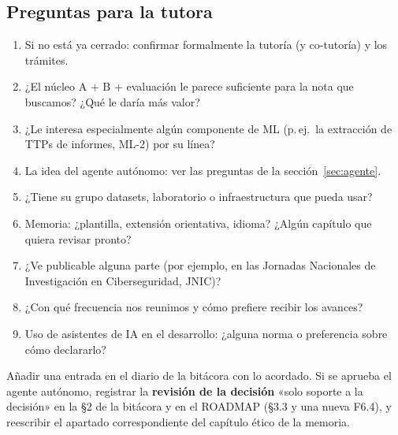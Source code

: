 \documentclass[11pt,a4paper]{article}
\begin{document}
\subsection*{Preguntas para la tutora}
\begin{enumerate}
  \item Si no está ya cerrado: confirmar formalmente la tutoría (y co-tutoría) y los trámites.
  \item ¿El núcleo A + B + evaluación le parece suficiente para la nota que buscamos? ¿Qué le daría más valor?
  \item ¿Le interesa especialmente algún componente de ML (p.\,ej.\ la extracción de TTPs de informes, ML-2) por su línea?
  \item La idea del agente autónomo: ver las preguntas de la sección~\ref{sec:agente}.
  \item ¿Tiene su grupo datasets, laboratorio o infraestructura que pueda usar?
  \item Memoria: ¿plantilla, extensión orientativa, idioma? ¿Algún capítulo que quiera revisar pronto?
  \item ¿Ve publicable alguna parte (por ejemplo, en las Jornadas Nacionales de Investigación en Ciberseguridad, JNIC)?
  \item ¿Con qué frecuencia nos reunimos y cómo prefiere recibir los avances?
  \item Uso de asistentes de IA en el desarrollo: ¿alguna norma o preferencia sobre cómo declararlo?
\end{enumerate}

\vspace{1em}
\begin{resumen}
Añadir una entrada en el diario de la bitácora con lo acordado. Si se aprueba el agente autónomo, registrar la
\textbf{revisión de la decisión} «solo soporte a la decisión» en la §2 de la bitácora y en el ROADMAP (§3.3 y una nueva
F6.4), y reescribir el apartado correspondiente del capítulo ético de la memoria.
\end{resumen}

\newpage
\appendix
\end{document}
